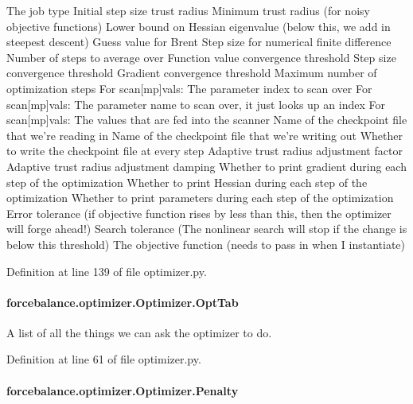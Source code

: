 The job type Initial step size trust radius Minimum trust radius (for noisy objective functions) Lower bound on Hessian eigenvalue (below this, we add in steepest descent) Guess value for Brent Step size for numerical finite difference Number of steps to average over Function value convergence threshold Step size convergence threshold Gradient convergence threshold Maximum number of optimization steps For scan\mbox{[}mp\mbox{]}vals\-: The parameter index to scan over For scan\mbox{[}mp\mbox{]}vals\-: The parameter name to scan over, it just looks up an index For scan\mbox{[}mp\mbox{]}vals\-: The values that are fed into the scanner Name of the checkpoint file that we're reading in Name of the checkpoint file that we're writing out Whether to write the checkpoint file at every step Adaptive trust radius adjustment factor Adaptive trust radius adjustment damping Whether to print gradient during each step of the optimization Whether to print Hessian during each step of the optimization Whether to print parameters during each step of the optimization Error tolerance (if objective function rises by less than this, then the optimizer will forge ahead!) Search tolerance (The nonlinear search will stop if the change is below this threshold) The objective function (needs to pass in when I instantiate) 

Definition at line 139 of file optimizer.\-py.

\hypertarget{classforcebalance_1_1optimizer_1_1Optimizer_a30e7e28bf0af3cffc94aa51a58a3d345}{
\paragraph[{Opt\-Tab}]{\setlength{\rightskip}{0pt plus 5cm}forcebalance.\-optimizer.\-Optimizer.\-Opt\-Tab}}\label{classforcebalance_1_1optimizer_1_1Optimizer_a30e7e28bf0af3cffc94aa51a58a3d345}


A list of all the things we can ask the optimizer to do. 



Definition at line 61 of file optimizer.\-py.

\hypertarget{classforcebalance_1_1optimizer_1_1Optimizer_a5dc01aec7e22062a42cc83298c49cadd}{
\paragraph[{Penalty}]{\setlength{\rightskip}{0pt plus 5cm}forcebalance.\-optimizer.\-Optimizer.\-Penalty}}\label{classforcebalance_1_1optimizer_1_1Optimizer_a5dc01aec7e22062a42cc83298c49cadd}



